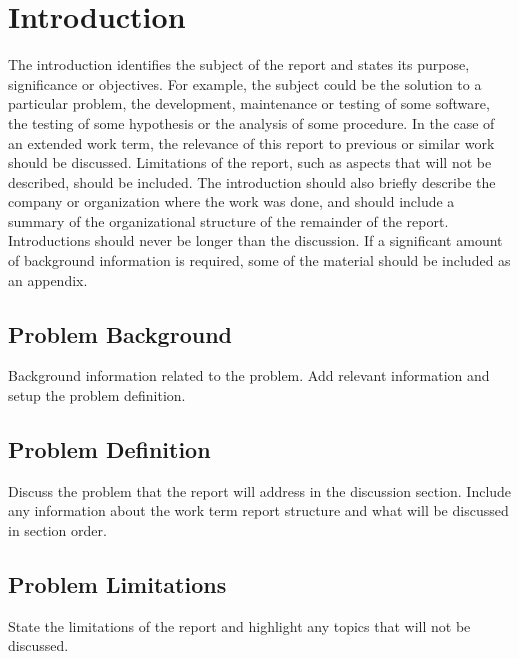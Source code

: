 \section{Introduction}

The introduction identifies the subject of the report and states its purpose, significance or objectives. For example, the subject could be the solution to a particular problem, the development, maintenance or testing of some software, the testing of some hypothesis or the analysis of some procedure. In the case of an extended work term, the relevance of this report to previous or similar work should be discussed. Limitations of the report, such as aspects that will not be described, should be included. The introduction should also briefly describe the company or organization where the work was done, and should include a summary of the organizational structure of the remainder of the report. Introductions should never be longer than the discussion. If a significant amount of background information is required, some of the material should be included as an appendix.

\subsection{Problem Background}

Background information related to the problem. Add relevant information and setup the problem definition.

\subsection{Problem Definition}

Discuss the problem that the report will address in the discussion section. Include any information about the work term report structure and what will be discussed in section order.

\subsection{Problem Limitations}

State the limitations of the report and highlight any topics that will not be discussed.
